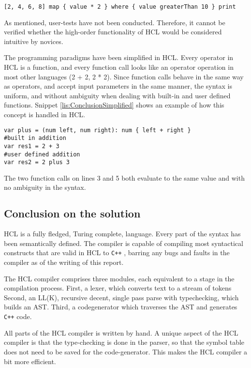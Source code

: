 \begin{lstlisting}[language=hcl,label=lis:ConclusionMapFilter,caption=High-order functionality in HCL]
[2, 4, 6, 8] map { value * 2 } where { value greaterThan 10 } print
\end{lstlisting}

As mentioned, user-tests have not been conducted.
Therefore, it cannot be verified whether the high-order functionality of HCL would be considered intuitive by novices.

The programming paradigms have been simplified in HCL.
Every operator in HCL is a function, and every function call looks like an operator operation in most other languages (2 + 2, 2 * 2).
Since function calls behave in the same way as operators, and accept input parameters in the same manner, the syntax is uniform, and without ambiguity when dealing with built-in and user defined functions.
Snippet \ref{lis:ConclusionSimplified} shows an example of how this concept is handled in HCL.

\begin{lstlisting}[language=hcl,label=lis:ConclusionSimplified,caption=Built-in and user defined function]
var plus = (num left, num right): num { left + right }
#built in addition
var res1 = 2 + 3
#user defined addition
var res2 = 2 plus 3 
\end{lstlisting}

The two function calls on lines 3 and 5 both evaluate to the same value and with no ambiguity in the syntax.

\subsection{Conclusion on the solution}
HCL is a fully fledged, Turing complete, language.
Every part of the syntax has been semantically defined. 
The compiler is capable of compiling most syntactical constructs that are valid in HCL to \texttt{C++} , barring any bugs and faults in the compiler as of the writing of this report.

The HCL compiler comprises three modules, each equivalent to a stage in the compilation process.
First, a lexer, which converts text to a stream of tokens
Second, an LL(K), recursive decent, single pass parse with typechecking, which builds an AST.
Third, a codegenerator which traverses the AST and generates \texttt{C++} code.

All parts of the HCL compiler is written by hand.
A unique aspect of the HCL compiler is that the type-checking is done in the parser, so that the symbol table does not need to be saved for the code-generator.
This makes the HCL compiler a bit more efficient.

